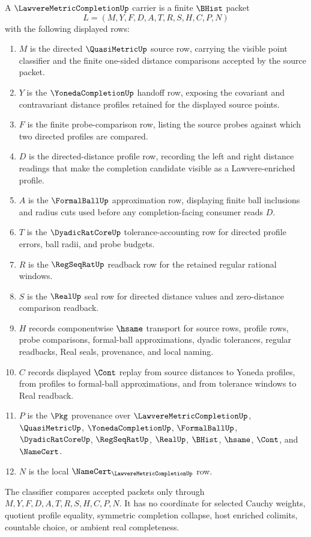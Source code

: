 \begin{definition}
\label{def:lawvere-metric-completion-carrier}
A $\LawvereMetricCompletionUp$ carrier is a finite $\BHist$ packet
$$
L=(M,Y,F,D,A,T,R,S,H,C,P,N)
$$
with the following displayed rows:
\begin{enumerate}
\item $M$ is the directed $\QuasiMetricUp$ source row, carrying the visible point classifier and the finite one-sided distance comparisons accepted by the source packet.
\item $Y$ is the $\YonedaCompletionUp$ handoff row, exposing the covariant and contravariant distance profiles retained for the displayed source points.
\item $F$ is the finite probe-comparison row, listing the source probes against which two directed profiles are compared.
\item $D$ is the directed-distance profile row, recording the left and right distance readings that make the completion candidate visible as a Lawvere-enriched profile.
\item $A$ is the $\FormalBallUp$ approximation row, displaying finite ball inclusions and radius cuts used before any completion-facing consumer reads $D$.
\item $T$ is the $\DyadicRatCoreUp$ tolerance-accounting row for directed profile errors, ball radii, and probe budgets.
\item $R$ is the $\RegSeqRatUp$ readback row for the retained regular rational windows.
\item $S$ is the $\RealUp$ seal row for directed distance values and zero-distance comparison readback.
\item $H$ records componentwise $\hsame$ transport for source rows, profile rows, probe comparisons, formal-ball approximations, dyadic tolerances, regular readbacks, Real seals, provenance, and local naming.
\item $C$ records displayed $\Cont$ replay from source distances to Yoneda profiles, from profiles to formal-ball approximations, and from tolerance windows to Real readback.
\item $P$ is the $\Pkg$ provenance over $\LawvereMetricCompletionUp$, $\QuasiMetricUp$, $\YonedaCompletionUp$, $\FormalBallUp$, $\DyadicRatCoreUp$, $\RegSeqRatUp$, $\RealUp$, $\BHist$, $\hsame$, $\Cont$, and $\NameCert$.
\item $N$ is the local $\NameCert_{\LawvereMetricCompletionUp}$ row.
\end{enumerate}
The classifier compares accepted packets only through $M,Y,F,D,A,T,R,S,H,C,P,N$. It has no coordinate for selected Cauchy weights, quotient profile equality, symmetric completion collapse, host enriched colimits, countable choice, or ambient real completeness.
\end{definition}

